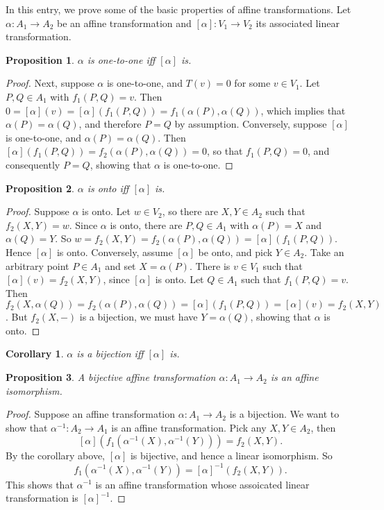 \documentclass[12pt]{article}
\newtheorem{prop}{Proposition}
\newtheorem{cor}{Corollary}
\begin{document}
In this entry, we prove some of the basic properties of affine transformations.  Let $\alpha:A_1\to A_2$ be an affine transformation and $[\alpha]:V_1\to V_2$ its associated linear transformation.

\begin{prop} $\alpha$ is one-to-one iff $[\alpha]$ is.\end{prop}
\begin{proof}
Next, suppose $\alpha$ is one-to-one, and $T(v)=0$ for some $v\in V_1$.  Let $P,Q\in A_1$ with $f_1(P,Q)=v$.  Then $0=[\alpha](v) = [\alpha](f_1(P,Q))=f_1(\alpha(P),\alpha(Q))$, which implies that $\alpha(P)=\alpha(Q)$, and therefore $P=Q$ by assumption.  Conversely, suppose $[\alpha]$ is one-to-one, and $\alpha(P)=\alpha(Q)$.  Then $[\alpha](f_1(P,Q))=f_2(\alpha(P),\alpha(Q))=0$, so that $f_1(P,Q)=0$, and consequently $P=Q$, showing that $\alpha$ is one-to-one.
\end{proof}

\begin{prop} $\alpha$ is onto iff $[\alpha]$ is.\end{prop}
\begin{proof}  Suppose $\alpha$ is onto.  Let $w\in V_2$, so there are $X,Y\in A_2$ such that $f_2(X,Y)=w$.  Since $\alpha$ is onto, there are $P,Q\in A_1$ with $\alpha(P)=X$ and $\alpha(Q)=Y$.  So $w=f_2(X,Y)=f_2(\alpha(P),\alpha(Q)) = [\alpha](f_1(P,Q))$.  Hence $[\alpha]$ is onto.  Conversely, assume $[\alpha]$ be onto, and pick $Y\in A_2$.  Take an arbitrary point $P\in A_1$ and set $X=\alpha(P)$.  There is $v\in V_1$ such that $[\alpha](v)=f_2(X,Y)$, since $[\alpha]$ is onto.  Let $Q\in A_1$ such that $f_1(P,Q)=v$.  Then $f_2(X,\alpha(Q)) = f_2(\alpha(P),\alpha(Q))= [\alpha](f_1(P,Q))=[\alpha](v)=f_2(X,Y)$.  But $f_2(X,-)$ is a bijection, we must have $Y=\alpha(Q)$, showing that $\alpha$ is onto.
\end{proof}

\begin{cor} $\alpha$ is a bijection iff $[\alpha]$ is. \end{cor}

\begin{prop} A bijective affine transformation $\alpha:A_1\to A_2$ is an affine isomorphism. \end{prop}
\begin{proof}
Suppose an affine transformation $\alpha: A_1\to A_2$ is a bijection.  We want to show that $\alpha^{-1}:A_2\to A_1$ is an affine transformation.  Pick any $X,Y\in A_2$, then $$[\alpha](f_1(\alpha^{-1}(X),\alpha^{-1}(Y))) = f_2(X,Y).$$  By the corollary above, $[\alpha]$ is bijective, and hence a linear isomorphism.  So $$f_1(\alpha^{-1}(X),\alpha^{-1}(Y))=[\alpha]^{-1}(f_2(X,Y)).$$  This shows that $\alpha^{-1}$ is an affine transformation whose assoicated linear transformation is $[\alpha]^{-1}$.
\end{proof}
\end{document}
